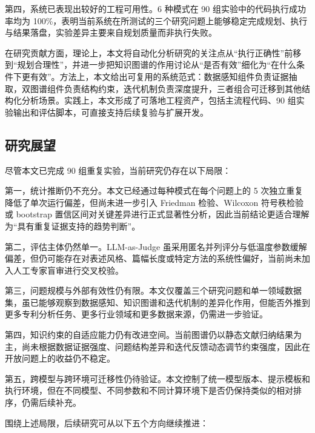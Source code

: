 第四，系统已表现出较好的工程可用性。6 种模式在 90 组实验中的代码执行成功率均为 100\%，表明当前系统在所测试的三个研究问题上能够稳定完成规划、执行与结果落盘，实验差异主要来自规划质量而非执行失败。

在研究贡献方面，理论上，本文将自动化分析研究的关注点从“执行正确性”前移到“规划合理性”，并进一步把知识图谱的作用讨论从“是否有效”细化为“在什么条件下更有效”。方法上，本文给出可复用的系统范式：数据感知组件负责证据抽取，双图谱组件负责结构约束，迭代机制负责深度提升，三者组合可迁移到其他结构化分析场景。实践上，本文形成了可落地工程资产，包括主流程代码、90 组实验输出和评估脚本，可直接支持后续复验与扩展开发。

\subsection{研究展望}

尽管本文已完成 90 组重复实验，当前研究仍存在以下局限：

第一，统计推断仍不充分。本文已经通过每种模式在每个问题上的 5 次独立重复降低了单次运行偏差，但尚未进一步引入 Friedman 检验、Wilcoxon 符号秩检验或 bootstrap 置信区间对关键差异进行正式显著性分析，因此当前结论更适合理解为“具有重复证据支持的趋势判断”。

第二，评估主体仍然单一。LLM-as-Judge 虽采用匿名并列评分与低温度参数缓解偏差，但仍可能存在对表述风格、篇幅长度或特定方法的系统性偏好，当前尚未加入人工专家盲审进行交叉校验。

第三，问题规模与外部有效性仍有限。本文仅覆盖三个研究问题和单一领域数据集，虽已能够观察到数据感知、知识图谱和迭代机制的差异化作用，但能否外推到更多专利分析任务、更多行业领域和更多数据来源，仍需进一步验证。

第四，知识约束的自适应能力仍有改进空间。当前图谱仍以静态文献归纳结果为主，尚未根据数据证据强度、问题结构差异和迭代反馈动态调节约束强度，因此在开放问题上的收益仍不稳定。

第五，跨模型与跨环境可迁移性仍待验证。本文控制了统一模型版本、提示模板和执行环境，但在不同模型、不同参数和不同计算环境下是否仍保持类似的相对排序，仍需后续补充。

围绕上述局限，后续研究可从以下五个方向继续推进：

